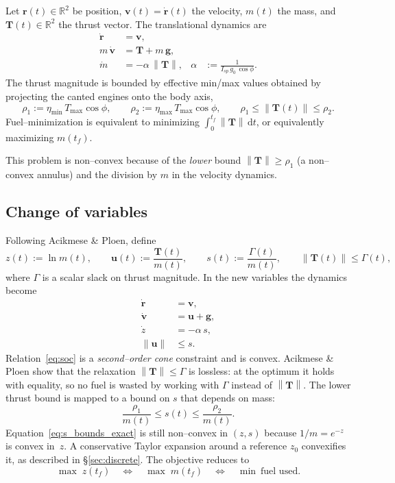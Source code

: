 \documentclass[11pt]{article}
\newcommand{\norm}[1]{\left\|#1\right\|}
\newcommand{\bv}[1]{\bm{#1}}
\begin{document}
Let $\bv r(t)\in\mathbb{R}^2$ be position, $\bv v(t)=\dot{\bv r}(t)$
the velocity, $m(t)$ the mass, and $\bv T(t)\in\mathbb{R}^2$ the
thrust vector.  The translational dynamics are
\begin{align}
\dot{\bv r} &= \bv v, \\
m\,\dot{\bv v} &= \bv T + m\,\bv g, \\
\dot m &= -\alpha\,\norm{\bv T}, &
\alpha &:= \frac{1}{I_{sp}\,g_0\,\cos\phi}.
\label{eq:alpha}
\end{align}
The thrust magnitude is bounded by effective min/max values obtained
by projecting the canted engines onto the body axis,
\begin{equation}
\rho_1 := \eta_{\min}\,T_{\max}\cos\phi,
\qquad
\rho_2 := \eta_{\max}\,T_{\max}\cos\phi,
\qquad
\rho_1 \le \norm{\bv T(t)} \le \rho_2 .
\label{eq:thrust_bounds}
\end{equation}
Fuel--minimization is equivalent to minimizing
$\int_0^{t_f}\norm{\bv T}\,\mathrm{d}t$, or equivalently
maximizing $m(t_f)$.

This problem is non--convex because of the \emph{lower} bound
$\norm{\bv T}\ge\rho_1$ (a non--convex annulus) and the division by
$m$ in the velocity dynamics.

\subsection{Change of variables}

Following Acikmese \& Ploen, define
\begin{equation}
z(t) := \ln m(t),\qquad
\bv u(t) := \frac{\bv T(t)}{m(t)},\qquad
s(t) := \frac{\Gamma(t)}{m(t)},\qquad
\norm{\bv T(t)}\le\Gamma(t),
\label{eq:cov}
\end{equation}
where $\Gamma$ is a scalar slack on thrust magnitude.  In the new
variables the dynamics become
\begin{align}
\dot{\bv r} &= \bv v, \\
\dot{\bv v} &= \bv u + \bv g, \\
\dot z      &= -\alpha\,s, \\
\norm{\bv u} &\le s .
\label{eq:soc}
\end{align}
Relation~\eqref{eq:soc} is a \emph{second--order cone} constraint
and is convex.  Acikmese \& Ploen show that the relaxation
$\norm{\bv T}\le\Gamma$ is lossless: at the optimum it holds with
equality, so no fuel is wasted by working with $\Gamma$ instead of
$\norm{\bv T}$.  The lower thrust bound is mapped to a bound on $s$
that depends on mass:
\begin{equation}
\frac{\rho_1}{m(t)} \le s(t) \le \frac{\rho_2}{m(t)} .
\label{eq:s_bounds_exact}
\end{equation}
Equation~\eqref{eq:s_bounds_exact} is still non--convex in $(z,s)$
because $1/m=e^{-z}$ is convex in~$z$.  A conservative Taylor
expansion around a reference $z_0$ convexifies it, as described in
\S\ref{sec:discrete}.  The objective reduces to
\begin{equation}
\max\; z(t_f) \quad\Longleftrightarrow\quad \max\; m(t_f)
\quad\Longleftrightarrow\quad \min\ \text{fuel used}.
\end{equation}
\end{document}
